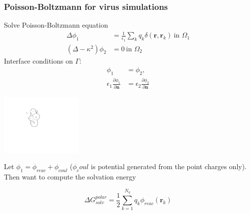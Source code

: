 \documentclass[dvipsnames,10pt]{beamer}
\begin{document}
\begin{frame}
    \frametitle{Poisson-Boltzmann for virus simulations}

    \vspace{.3cm}

    \begin{minipage}{5cm}
        Solve Poisson-Boltzmann equation
        \begin{align}
            \Delta\phi_1 &= \frac{1}{\epsilon_1}\sum_{k}q_k\delta(\mathbf{r}, \mathbf{r}_k)~\text{in }\Omega_1\nonumber\\
            (\Delta - \kappa^2)\phi_2 &= 0~\text{in }\Omega_2\nonumber
        \end{align}
        Interface conditions on $\Gamma$:
        \begin{align}
            \phi_1 &= \phi_2,\nonumber\\
            \epsilon_1\frac{\partial\phi_1}{\partial\mathbf{n}} &= \epsilon_2\frac{\partial\phi_2}{\partial \mathbf{n}}\nonumber
    \end{align}

    \end{minipage}
    \begin{minipage}{5cm}
        \includegraphics[width=4cm]{../figs/implicit_solvent.pdf}
    \end{minipage}
    Let $\phi_1 = \phi_{reac} + \phi_{coul}$ ($\phi_coul$ is potential generated from the point charges only). Then
    want to compute the solvation energy
    \begin{tcolorbox}
        $$
        \Delta G_{solv}^{polar} = \frac{1}{2}\sum_{k=1}^{N_q}q_k\phi_{reac}(\mathbf{r}_k)
        $$
    \end{tcolorbox}

\end{frame}
\end{document}
